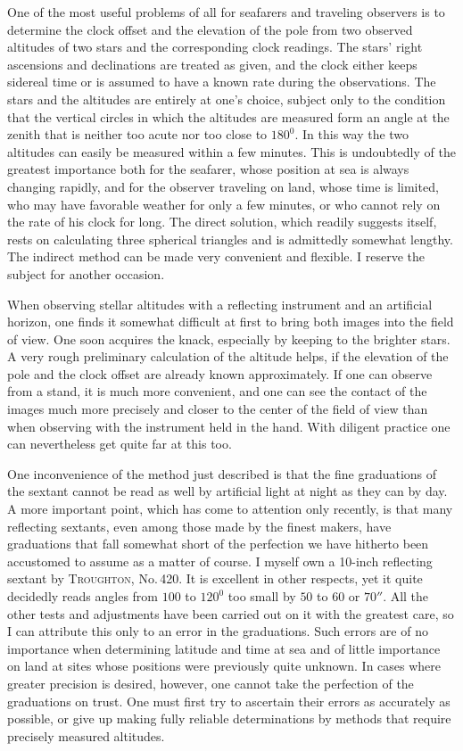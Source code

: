 One of the most useful problems of all for seafarers and traveling observers is to determine the clock offset and the elevation of the pole from two observed altitudes of two stars and the corresponding clock readings. The stars’ right ascensions and declinations are treated as given, and the clock either keeps sidereal time or is assumed to have a known rate during the observations. The stars and the altitudes are entirely at one’s choice, subject only to the condition that the vertical circles in which the altitudes are measured form an angle at the zenith that is neither too acute nor too close to $180^0$. In this way the two altitudes can easily be measured within a few minutes. This is undoubtedly of the greatest importance both for the seafarer, whose position at sea is always changing rapidly, and for the observer traveling on land, whose time is limited, who may have favorable weather for only a few minutes, or who cannot rely on the rate of his clock for long. The direct solution, which readily suggests itself, rests on calculating three spherical triangles and is admittedly somewhat lengthy. The indirect method can be made very convenient and flexible. I reserve the subject for another occasion.

When observing stellar altitudes with a reflecting instrument and an artificial horizon, one finds it somewhat difficult at first to bring both images into the field of view. One soon acquires the knack, especially by keeping to the brighter stars. A very rough preliminary calculation of the altitude helps, if the elevation of the pole and the clock offset are already known approximately. If one can observe from a stand,
%
it is much more convenient, and one can see the contact of the images much more precisely and closer to the center of the field of view than when observing with the instrument held in the hand. With diligent practice one can nevertheless get quite far at this too.

One inconvenience of the method just described is that the fine graduations of the sextant cannot be read as well by artificial light at night as they can by day. A more important point, which has come to attention only recently, is that many reflecting sextants, even among those made by the finest makers, have graduations that fall somewhat short of the perfection we have hitherto been accustomed to assume as a matter of course. I myself own a 10-inch reflecting sextant by \textsc{Troughton}, No.\,420. It is excellent in other respects, yet it quite decidedly reads angles from $100$ to $120^0$ too small by $50$ to $60$ or $70''$. All the other tests and adjustments have been carried out on it with the greatest care, so I can attribute this only to an error in the graduations. Such errors are of no importance when determining latitude and time at sea and of little importance on land at sites whose positions were previously quite unknown. In cases where greater precision is desired, however, one cannot take the perfection of the graduations on trust. One must first try to ascertain their errors as accurately as possible, or give up making fully reliable determinations by methods that require precisely measured altitudes.

